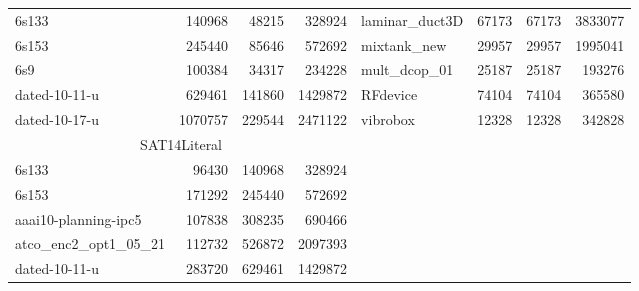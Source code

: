 \documentclass[a4paper,12pt,titlepage, BCOR7mm,headsepline]{scrbook}
\numberwithin{equation}{section}
\begin{document}
\begin{table}[H]
\begin{adjustbox}{max width=\textwidth}
\begin{tabular}{lrrr||l|rrr}
                         6s133                                 & 140968  & 48215  & 328924  &laminar\_duct3D                                      & 67173   & 67173  & 3833077 \\
                         6s153                                 & 245440  & 85646  & 572692  &mixtank\_new                                         & 29957   & 29957  & 1995041 \\
                         6s9                                   & 100384  & 34317  & 234228  &mult\_dcop\_01                                       & 25187   & 25187  & 193276  \\
                         dated-10-11-u                         & 629461  & 141860 & 1429872 &RFdevice                                             & 74104   & 74104  & 365580  \\
                         dated-10-17-u                         & 1070757 & 229544 & 2471122 &vibrobox                                             & 12328   & 12328  & 342828  \\
                         \cline{1-4}
                         \cline{5-8}
                         \cline{5-8}
                         \cline{1-4}
                         \multicolumn{4}{c||}{SAT14Literal} \\
                         \cline{1-4}
                         \cline{1-4}
                         6s133                                 & 96430   & 140968 & 328924  \\
                         6s153                                 & 171292  & 245440 & 572692  \\
                         aaai10-planning-ipc5                  & 107838  & 308235 & 690466  \\
                         atco\_enc2\_opt1\_05\_21              & 112732  & 526872 & 2097393 \\
                         dated-10-11-u                         & 283720  & 629461 & 1429872 \\
                         \hline\hline
        \end{tabular}
        \end{adjustbox}
        \end{table}
        
\end{document}
